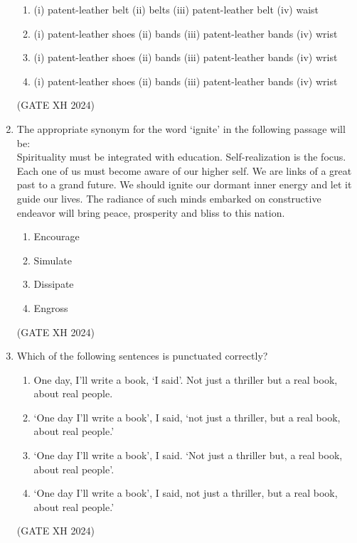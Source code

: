 \documentclass{article}
\begin{document}
\begin{enumerate}[leftmargin=*, start=11, label=Q.\arabic*.]
    \begin{enumerate}
        \item (i) patent-leather belt (ii) belts (iii) patent-leather belt (iv) waist
        \item (i) patent-leather shoes (ii) bands (iii) patent-leather bands (iv) wrist
        \item (i) patent-leather shoes (ii) bands (iii) patent-leather bands (iv) wrist
        \item (i) patent-leather shoes (ii) bands (iii) patent-leather bands (iv) wrist
    \end{enumerate} \hfill (GATE XH 2024)

    \item The appropriate synonym for the word ‘ignite’ in the following passage will be: \\ Spirituality must be integrated with education. Self-realization is the focus. Each one of us must become aware of our higher self. We are links of a great past to a grand future. We should ignite our dormant inner energy and let it guide our lives. The radiance of such minds embarked on constructive endeavor will bring peace, prosperity and bliss to this nation.
    
    \begin{multicols}{4}
        \begin{enumerate}
            \item Encourage
            \item Simulate
            \item Dissipate
            \item Engross
        \end{enumerate}
    \end{multicols} \hfill (GATE XH 2024)

    \item Which of the following sentences is punctuated correctly?
    
    \begin{enumerate}
        \item One day, I’ll write a book, ‘I said’. Not just a thriller but a real book, about real people.
        \item ‘One day I’ll write a book’, I said, ‘not just a thriller, but a real book, about real people.’
        \item ‘One day I’ll write a book’, I said. ‘Not just a thriller but, a real book, about real people’.
        \item ‘One day I’ll write a book’, I said, not just a thriller, but a real book, about real people.’
    \end{enumerate} \hfill (GATE XH 2024)


\end{enumerate}
\end{document}
